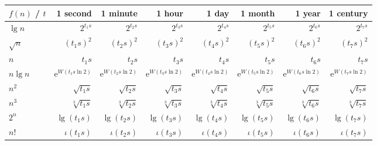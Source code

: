 \documentclass[12pt]{article}
\newcommand{\euler}{\mathrm{e}}
\begin{document}
\begin{table}[htbp]
    \renewcommand{\arraystretch}{1.2}
    \setlength{\tabcolsep}{7pt}
    \centering
    \begin{tabular}{l*{7}{r}}
        \toprule
        $f(n)$ / $t$ & 1 second & 1 minute & 1 hour & 1 day & 1 month & 1 year & 1 century \\ \midrule
        $\lg n$ & $2^{t_{1} s}$ & $2^{t_{2} s}$ & $2^{t_{3} s}$ & $2^{t_{4} s}$ & $2^{t_{5} s}$ & $2^{t_{6} s}$ & $2^{t_{7} s}$ \\
        $\sqrt{n}$ & $(t_{1} s)^{2}$ & $(t_{2} s)^{2}$ & $(t_{3} s)^{2}$ & $(t_{4} s)^{2}$ & $(t_{5} s)^{2}$ & $(t_{6} s)^{2}$ & $(t_{7} s)^{2}$ \\
        $n$ & $t_{1} s$ & $t_{2} s$ & $t_{3} s$ & $t_{4} s$ & $t_{5} s$ & $t_{6} s$ & $t_{7} s$ \\
        $n \lg n$ & $\euler^{W(t_{1} s \ln 2)}$ & $\euler^{W(t_{2} s \ln 2)}$ & $\euler^{W(t_{3} s \ln 2)}$ & $\euler^{W(t_{4} s \ln 2)}$ & $\euler^{W(t_{5} s \ln 2)}$ & $\euler^{W(t_{6} s \ln 2)}$ & $\euler^{W(t_{7} s \ln 2)}$ \\
        $n^{2}$ & $\sqrt{t_{1} s}$ & $\sqrt{t_{2} s}$ & $\sqrt{t_{3} s}$ & $\sqrt{t_{4} s}$ & $\sqrt{t_{5} s}$ & $\sqrt{t_{6} s}$ & $\sqrt{t_{7} s}$ \\
        $n^{3}$ & $\sqrt[3]{t_{1} s}$ & $\sqrt[3]{t_{2} s}$ & $\sqrt[3]{t_{3} s}$ & $\sqrt[3]{t_{4} s}$ & $\sqrt[3]{t_{5} s}$ & $\sqrt[3]{t_{6} s}$ & $\sqrt[3]{t_{7} s}$ \\
        $2^{n}$ & $\lg(t_{1} s)$ & $\lg(t_{2} s)$ & $\lg(t_{3} s)$ & $\lg(t_{4} s)$ & $\lg(t_{5} s)$ & $\lg(t_{6} s)$ & $\lg(t_{7} s)$ \\
        $n!$ & $\iota(t_{1} s)$ & $\iota(t_{2} s)$ & $\iota(t_{3} s)$ & $\iota(t_{4} s)$ & $\iota(t_{5} s)$ & $\iota(t_{6} s)$ & $\iota(t_{7} s)$ \\
        \bottomrule
    \end{tabular}
\end{table}


{\footnotesize
}
\end{document}
